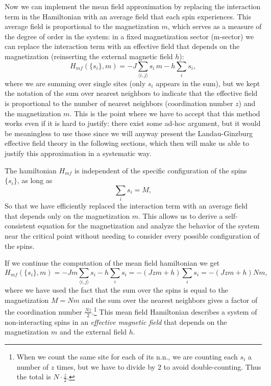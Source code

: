 Now we can implement the mean field approximation by replacing the interaction term in the Hamiltonian with an average field that each spin experiences. This average field is proportional to the magnetization \(m\), which serves as a measure of the degree of order in the system: in a fixed magnetization sector (m-sector) we can replace the interaction term with an effective field that depends on the magnetization (reinserting the external magnetic field \(h\)):
\[
    H_{mf} (\{s_i\}, m) = -J \sum_{\langle i, j \rangle} s_i \, m - h \sum_i s_i,
\]
where we are summing over single sites (only \(s_i\) appears in the sum), but we kept the notation of the sum over nearest neighbors to indicate that the effective field is proportional to the number of nearest neighbors (coordination number \(z\)) and the magnetization \(m\). This is the point where we have to accept that this method works even if it is hard to justify: there exist some ad-hoc argument, but it would be meaningless to use those since we will anyway present the Landau-Ginzburg effective field theory in the following sections, which then will make us able to justify this approximation in a systematic way.

\begin{remark}
    The hamiltonian \(H_{mf}\) is independent of the specific configuration of the spins \(\{s_i\}\), as long as
    \[
        \sum_{i} s_i = M,
    \]
    So that we have efficiently replaced the interaction term with an average field that depends only on the magnetization \(m\). This allows us to derive a self-consistent equation for the magnetization and analyze the behavior of the system near the critical point without needing to consider every possible configuration of the spins.
\end{remark}

If we continue the computation of the mean field hamiltonian  we get
\[
    H_{mf} (\{s_i\}, m) = -J m \sum_{\langle i, j \rangle} s_i - h \sum_i s_i = - (J z m + h) \sum_i s_i = - (J z m + h) Nm,
\]
where we have used the fact that the sum over the spins is equal to the magnetization \(M = Nm\) and the sum over the nearest neighbors gives a factor of the coordination number \(\frac{Nz}{2}\).\footnote{When we count the same site for each of its n.n., we are counting each \(s_i\) a number of \(z\) times, but we have to divide by 2 to avoid double-counting. Thus the total is \(N\cdot \frac{z}{2}\).} This mean field Hamiltonian describes a system of non-interacting spins in an \textit{effective magnetic field} that depends on the magnetization \(m\) and the external field \(h\).

